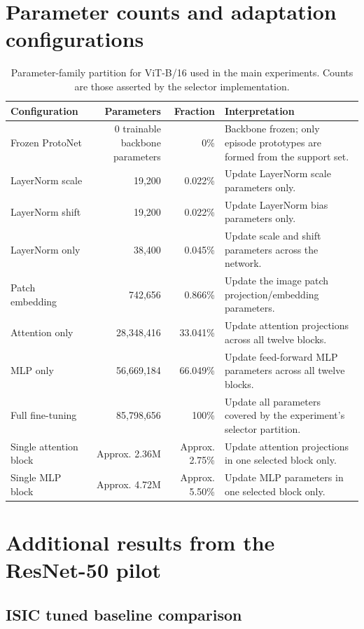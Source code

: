 \documentclass[11pt]{article}
\begin{document}
\appendix
\section{Parameter counts and adaptation configurations}

\begin{table}[!htbp]
\centering
\small
\caption{Parameter-family partition for ViT-B/16 used in the main experiments. Counts are those asserted by the selector implementation.}
\label{tab:paramcounts}
\begin{tabularx}{\textwidth}{lrrY}
\toprule
Configuration & Parameters & Fraction & Interpretation\\
\midrule
Frozen ProtoNet & 0 trainable backbone parameters & 0\% & Backbone frozen; only episode prototypes are formed from the support set.\\
LayerNorm scale & 19,200 & 0.022\% & Update LayerNorm scale parameters only.\\
LayerNorm shift & 19,200 & 0.022\% & Update LayerNorm bias parameters only.\\
LayerNorm only & 38,400 & 0.045\% & Update scale and shift parameters across the network.\\
Patch embedding & 742,656 & 0.866\% & Update the image patch projection/embedding parameters.\\
Attention only & 28,348,416 & 33.041\% & Update attention projections across all twelve blocks.\\
MLP only & 56,669,184 & 66.049\% & Update feed-forward MLP parameters across all twelve blocks.\\
Full fine-tuning & 85,798,656 & 100\% & Update all parameters covered by the experiment's selector partition.\\
Single attention block & Approx. 2.36M & Approx. 2.75\% & Update attention projections in one selected block only.\\
Single MLP block & Approx. 4.72M & Approx. 5.50\% & Update MLP parameters in one selected block only.\\
\bottomrule
\end{tabularx}
\end{table}

\section{Additional results from the ResNet-50 pilot}

\subsection{ISIC tuned baseline comparison}
\end{document}
